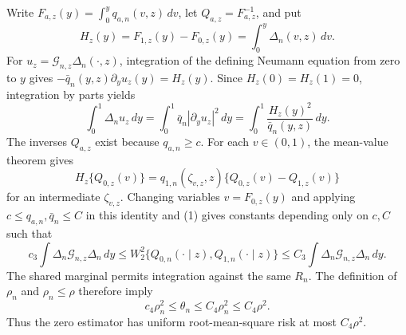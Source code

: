Write \(F_{a,z}(y)=\int_0^yq_{a,n}(v,z)\,dv\), let \(Q_{a,z}=F_{a,z}^{-1}\), and put
\[
H_z(y)=F_{1,z}(y)-F_{0,z}(y)=\int_0^y\Delta_n(v,z)\,dv.
\]
For \(u_z=\mathcal G_{n,z}\Delta_n(\cdot,z)\), integration of the defining Neumann equation from zero to \(y\) gives \(-\bar q_n(y,z)\partial_yu_z(y)=H_z(y)\).  Since \(H_z(0)=H_z(1)=0\), integration by parts yields
\[
\int_0^1\Delta_nu_z\,dy
=\int_0^1\bar q_n|\partial_yu_z|^2\,dy
=\int_0^1\frac{H_z(y)^2}{\bar q_n(y,z)}\,dy.                              \tag{1}
\]
The inverses \(Q_{a,z}\) exist because \(q_{a,n}\ge c\).  For each \(v\in(0,1)\), the mean-value theorem gives
\[
H_z\{Q_{0,z}(v)\}=q_{1,n}(\zeta_{v,z},z)\{Q_{0,z}(v)-Q_{1,z}(v)\}
\]
for an intermediate \(\zeta_{v,z}\).  Changing variables \(v=F_{0,z}(y)\) and applying \(c\le q_{a,n},\bar q_n\le C\) in this identity and (1) gives constants depending only on \(c,C\) such that
\[
c_3\int\Delta_n\mathcal G_{n,z}\Delta_n\,dy
\le W_2^2\{Q_{0,n}(\cdot\mid z),Q_{1,n}(\cdot\mid z)\}
\le C_3\int\Delta_n\mathcal G_{n,z}\Delta_n\,dy.                       \tag{2}
\]
The shared marginal permits integration against the same \(R_n\).  The definition of \(\rho_n\) and \(\rho_n\le\rho\) therefore imply
\[
c_4\rho_n^2\le\theta_n\le C_4\rho_n^2\le C_4\rho^2.                    \tag{3}
\]
Thus the zero estimator has uniform root-mean-square risk at most \(C_4\rho^2\).

